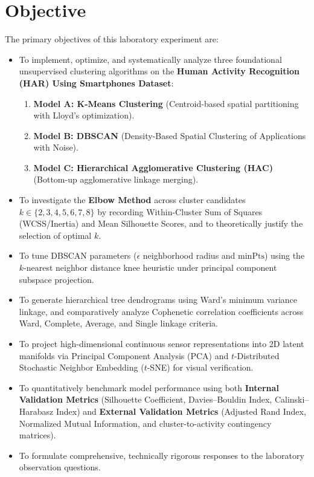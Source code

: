\documentclass[12pt,a4paper]{article}
\begin{document}
\section{Objective}
The primary objectives of this laboratory experiment are:
\begin{itemize}[noitemsep]
    \item To implement, optimize, and systematically analyze three foundational unsupervised clustering algorithms on the \textbf{Human Activity Recognition (HAR) Using Smartphones Dataset}:
    \begin{enumerate}[label=(\alph*),noitemsep]
        \item \textbf{Model A: K-Means Clustering} (Centroid-based spatial partitioning with Lloyd's optimization).
        \item \textbf{Model B: DBSCAN} (Density-Based Spatial Clustering of Applications with Noise).
        \item \textbf{Model C: Hierarchical Agglomerative Clustering (HAC)} (Bottom-up agglomerative linkage merging).
    \end{enumerate}
    \item To investigate the \textbf{Elbow Method} across cluster candidates $k \in \{2, 3, 4, 5, 6, 7, 8\}$ by recording Within-Cluster Sum of Squares (WCSS/Inertia) and Mean Silhouette Scores, and to theoretically justify the selection of optimal $k$.
    \item To tune DBSCAN parameters ($\epsilon$ neighborhood radius and $\text{minPts}$) using the $k$-nearest neighbor distance knee heuristic under principal component subspace projection.
    \item To generate hierarchical tree dendrograms using Ward's minimum variance linkage, and comparatively analyze Cophenetic correlation coefficients across Ward, Complete, Average, and Single linkage criteria.
    \item To project high-dimensional continuous sensor representations into 2D latent manifolds via Principal Component Analysis (PCA) and $t$-Distributed Stochastic Neighbor Embedding ($t$-SNE) for visual verification.
    \item To quantitatively benchmark model performance using both \textbf{Internal Validation Metrics} (Silhouette Coefficient, Davies--Bouldin Index, Calinski--Harabasz Index) and \textbf{External Validation Metrics} (Adjusted Rand Index, Normalized Mutual Information, and cluster-to-activity contingency matrices).
    \item To formulate comprehensive, technically rigorous responses to the laboratory observation questions.
\end{itemize}
\end{document}
